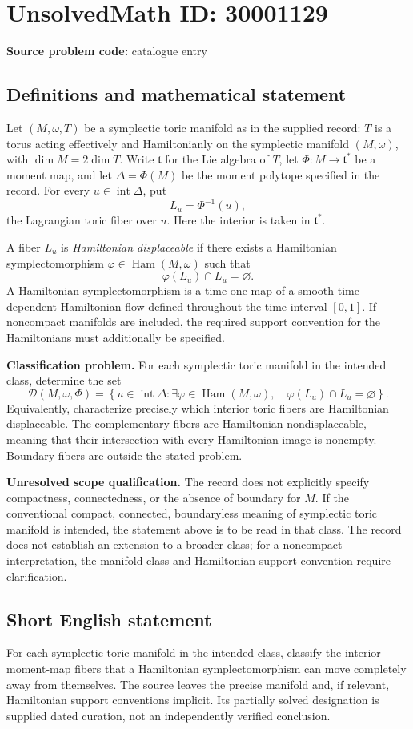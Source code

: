 \documentclass[11pt]{article}
\begin{document}
\section*{UnsolvedMath ID: 30001129}
\textbf{Source problem code:} catalogue entry
\subsection{Definitions and mathematical statement}
Let \((M,\omega,T)\) be a symplectic toric manifold as in the supplied record: \(T\) is a torus acting effectively and Hamiltonianly on the symplectic manifold \((M,\omega)\), with \(\dim M=2\dim T\). Write \(\mathfrak t\) for the Lie algebra of \(T\), let \(\Phi:M\to\mathfrak t^*\) be a moment map, and let \(\Delta=\Phi(M)\) be the moment polytope specified in the record. For every \(u\in\operatorname{int}\Delta\), put
\[
L_u=\Phi^{-1}(u),
\]
the Lagrangian toric fiber over \(u\). Here the interior is taken in \(\mathfrak t^*\).

A fiber \(L_u\) is \emph{Hamiltonian displaceable} if there exists a Hamiltonian symplectomorphism \(\varphi\in\operatorname{Ham}(M,\omega)\) such that
\[
\varphi(L_u)\cap L_u=\varnothing.
\]
A Hamiltonian symplectomorphism is a time-one map of a smooth time-dependent Hamiltonian flow defined throughout the time interval \([0,1]\). If noncompact manifolds are included, the required support convention for the Hamiltonians must additionally be specified.

\textbf{Classification problem.} For each symplectic toric manifold in the intended class, determine the set
\[
\mathcal D(M,\omega,\Phi)
=\left\{u\in\operatorname{int}\Delta:
\exists\varphi\in\operatorname{Ham}(M,\omega),\quad
\varphi(L_u)\cap L_u=\varnothing\right\}.
\]
Equivalently, characterize precisely which interior toric fibers are Hamiltonian displaceable. The complementary fibers are Hamiltonian nondisplaceable, meaning that their intersection with every Hamiltonian image is nonempty. Boundary fibers are outside the stated problem.

\textbf{Unresolved scope qualification.} The record does not explicitly specify compactness, connectedness, or the absence of boundary for \(M\). If the conventional compact, connected, boundaryless meaning of symplectic toric manifold is intended, the statement above is to be read in that class. The record does not establish an extension to a broader class; for a noncompact interpretation, the manifold class and Hamiltonian support convention require clarification.
\subsection{Short English statement}
For each symplectic toric manifold in the intended class, classify the interior moment-map fibers that a Hamiltonian symplectomorphism can move completely away from themselves. The source leaves the precise manifold and, if relevant, Hamiltonian support conventions implicit. Its partially solved designation is supplied dated curation, not an independently verified conclusion.
\end{document}
